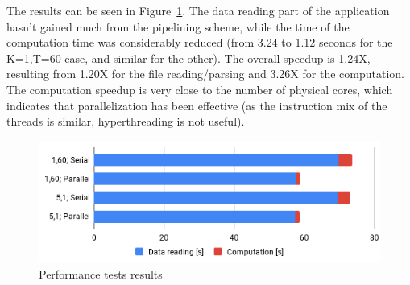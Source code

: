 \documentclass[a4paper, 10pt]{article}
\begin{document}
The results can be seen in Figure~\ref{fig:results}. The data reading part of the application hasn't gained much from the pipelining scheme, while the time of the computation time was considerably reduced (from 3.24 to 1.12 seconds for the K=1,T=60 case, and similar for the other).
The overall speedup is 1.24X, resulting from 1.20X for the file reading/parsing and 3.26X for the computation.
The computation speedup is very close to the number of physical cores, which indicates that parallelization has been effective (as the instruction mix of the threads is similar, hyperthreading is not useful).


\begin{figure}[h]
\centering
    \includegraphics[width=0.5125\linewidth]{images/results.png}
    \caption{Performance tests results}
   \label{fig:results}
\end{figure}
\end{document}
